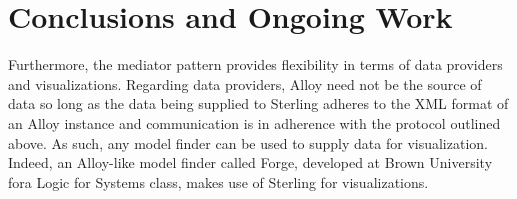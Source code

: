 \documentclass[runningheads]{llncs}
\begin{document}
\section{Conclusions and Ongoing Work}
\label{conclusions}

Furthermore, the mediator pattern provides flexibility in terms of data providers and visualizations. Regarding data providers, Alloy need not be the source of data so long as the data being supplied to Sterling adheres to the XML format of an Alloy instance and communication is in adherence with the protocol outlined above. As such, any model finder can be used to supply data for visualization. Indeed, an Alloy-like model finder called Forge, developed at Brown University fora Logic for Systems class, makes use of Sterling for visualizations.



\end{document}
